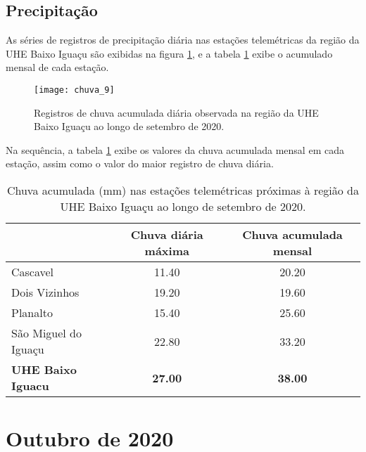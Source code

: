 \documentclass[a4paper,12pt]{article}
\begin{document}
\newpage


                   \subsection{Precipitação}
                   \hspace{0.5cm} As séries de registros de precipitação diária nas estações telemétricas da região da UHE Baixo Iguaçu são exibidas na figura \ref{fig:figchuva}, e a
                   tabela \ref{tab:tabchuva} exibe o acumulado mensal de cada estação.

    \begin{figure}[!htb]
    \texttt{[image: chuva\_9]}
    \caption{Registros de chuva acumulada diária observada na região da UHE Baixo Iguaçu ao longo de setembro de 2020.}
    \label{fig:figchuva}
    \end{figure}
    
    Na sequência, a tabela \ref{tab:tabchuva} exibe os valores da chuva acumulada mensal em cada estação, 
    assim como o valor do maior registro de chuva diária.
    
    \begin{table}[!htb]
    \centering
    \caption{Chuva acumulada (mm) nas estações telemétricas próximas à região da UHE Baixo Iguaçu ao longo de setembro de 2020.}
    \label{tab:tabchuva}
    \begin{tabular}{lcc}
    \hline
                           & Chuva diária máxima      &   Chuva acumulada mensal \\
    \hline
      Cascavel                   &  11.40                   &   20.20    \\
      Dois Vizinhos                   &  19.20                   &   19.60    \\
      Planalto                   &  15.40                   &   25.60    \\
      São Miguel do Iguaçu                   &  22.80                   &   33.20    \\
      \textbf{UHE Baixo Iguacu}                   &  \textbf{27.00}                   &   \textbf{38.00}     \\
    \hline
    \end{tabular}
    \end{table}
        
\newpage
\section{Outubro de 2020}
\end{document}
